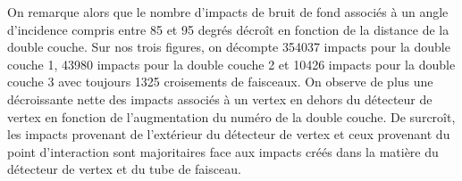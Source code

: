 %   
% 

  
  \medskip
  
  On remarque alors que le nombre d'impacts de bruit de fond associ\'es \`a un angle d'incidence compris entre 85 et 95 degr\'es d\'ecroît en fonction de la distance de la double couche. Sur nos trois figures, on décompte 354037 impacts pour la double couche 1, 43980 impacts pour la double couche 2 et 10426 impacts pour la double couche 3 avec toujours 1325 croisements de faisceaux. On observe de plus une d\'ecroissante nette des impacts associ\'es \`a un vertex en dehors du d\'etecteur de vertex en fonction de l'augmentation du num\'ero de la double couche. De surcroît, les impacts provenant de l'ext\'erieur du d\'etecteur de vertex et ceux provenant du point d'interaction sont majoritaires face aux impacts cr\'e\'es dans la mati\`ere du d\'etecteur de vertex et du tube de faisceau.

